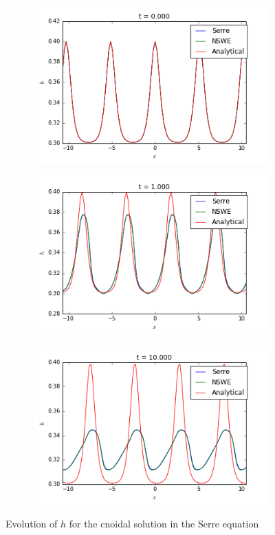 \begin{figure}[h!]
	\begin{subfigure}{.3\linewidth}
		\includegraphics[scale=.3]{figures/Serre/cnoidal1h.png}	
	\end{subfigure}
	\begin{subfigure}{.3\linewidth}
		\includegraphics[scale=.3]{figures/Serre/cnoidal2h.png}	
	\end{subfigure}
	\begin{subfigure}{.3\linewidth}
		\includegraphics[scale=.3]{figures/Serre/cnoidal3h.png}	
	\end{subfigure}
	\caption{Evolution of $h$ for the cnoidal solution in the Serre equation \label{fig:cnoidalh}}
\end{figure}

